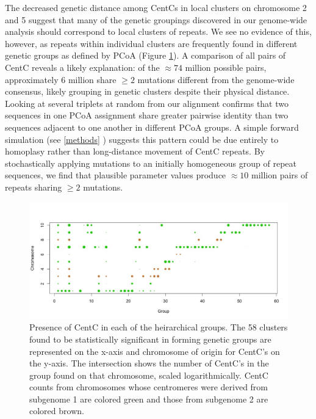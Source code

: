 The decreased genetic distance among CentCs in local clusters on chromosome 2 and 5 suggest that many of the genetic groupings discovered in our genome-wide analysis should correspond to local clusters of repeats. We see no evidence of this, however, as repeats within individual clusters are frequently found in different genetic groups as defined by PCoA (Figure \ref{pcoa}).  A comparison of all pairs of CentC reveals a likely explanation: of the $\approx 74$ million possible pairs,  approximately 6 million share $\geq 2$ mutations different from the genome-wide consensus, likely grouping in genetic clusters despite their physical distance.  Looking at several triplets at random from our alignment confirms that two sequences in one PCoA assignment share greater pairwise identity than two sequences adjacent to one another in different PCoA groups.  A simple forward simulation (see \ref{methods} ) suggests this pattern could be due entirely to homoplasy rather than long-distance movement of CentC repeats.  By stochastically applying mutations to an initially homogeneous group of repeat sequences, we find that plausible parameter values produce $\approx 10$ million pairs of repeats sharing $\geq 2$ mutations.      

\begin{figure}
\includegraphics[width=1\textwidth]{TW_CentCgraph.jpeg}
\caption{Presence of CentC in each of the heirarchical groups.  The 58 clusters found to be statistically significant in forming genetic groups are represented on the x-axis and chromosome of origin for CentC's on the y-axis. The intersection shows the number of CentC's in the group found on that chromosome, scaled logarithmically.  CentC counts from chromosomes whose centromeres were derived from subgenome 1 are colored green and those from subgenome 2 are colored brown.
}
\label{pcoa}    
\end{figure}

